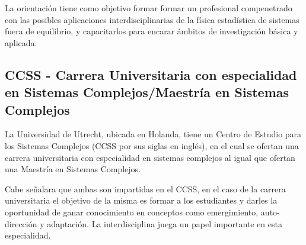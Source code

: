 	La orientación tiene como objetivo formar formar un profesional compenetrado con las posibles aplicaciones interdisciplinarias de la física estadística de sistemas fuera de equilibrio, y capacitarlos para encarar ámbitos de investigación básica y aplicada.

\subsection{CCSS - Carrera Universitaria con especialidad en Sistemas Complejos/Maestría en Sistemas Complejos}
	La Universidad de Utrecht, ubicada en Holanda, tiene un Centro de Estudio para los Sistemas Complejos (CCSS por sus siglas en inglés), en el cual se ofertan una carrera universitaria con especialidad en sistemas complejos\cite{CCSS} al igual que ofertan una Maestría en Sistemas Complejos.

	Cabe señalara que ambas son impartidas en el CCSS, en el caso de la carrera universitaria el objetivo de la misma es formar a los estudiantes y darles la oportunidad de ganar conocimiento en conceptos como emergimiento, auto-dirección y adaptación. La interdisciplina juega un papel importante en esta especialidad.

